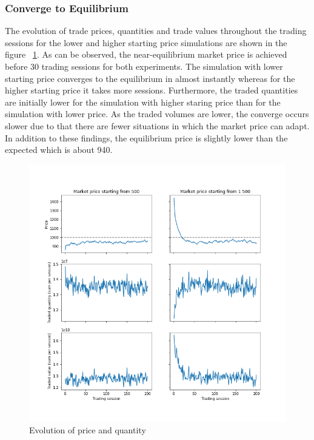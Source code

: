 \subsubsection{Converge to Equilibrium}
The evolution of trade prices, quantities and trade values throughout
the trading sessions for the lower and higher starting price simulations 
are shown in the figure ~\ref{fig:basic_trades}. As can be observed,
the near-equilibrium market price is achieved before 30 trading
sessions for both experiments. The simulation with lower starting price converges
to the equilibrium in almost instantly whereas for the higher starting
price it takes more sessions. Furthermore, the traded quantities are
initially lower for the simulation with higher staring price than 
for the simulation with lower price. As the traded volumes are lower,
the converge occurs slower due to that there are fewer situations in
which the market price can adapt. In addition to these findings, 
the equilibrium price is slightly lower than the expected which is 
about 940.

\begin{figure}[H]
    \includegraphics[width=\linewidth]{plots/basic_trades.png}
    \caption{Evolution of price and quantity} %
    \label{fig:basic_trades}
\end{figure}

